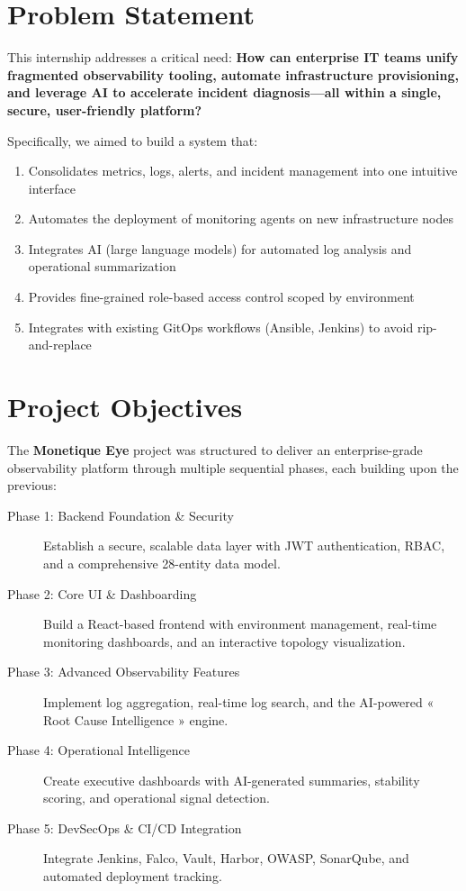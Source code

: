 \documentclass[12pt,a4paper]{report}
\begin{document}
\section*{Problem Statement}

This internship addresses a critical need: \textbf{How can enterprise IT teams unify fragmented observability tooling, automate infrastructure provisioning, and leverage AI to accelerate incident diagnosis—all within a single, secure, user-friendly platform?}

Specifically, we aimed to build a system that:

\begin{enumerate}
  \item Consolidates metrics, logs, alerts, and incident management into one intuitive interface
  \item Automates the deployment of monitoring agents on new infrastructure nodes
  \item Integrates AI (large language models) for automated log analysis and operational summarization
  \item Provides fine-grained role-based access control scoped by environment
  \item Integrates with existing GitOps workflows (Ansible, Jenkins) to avoid rip-and-replace
\end{enumerate}

\section*{Project Objectives}

The \textbf{Monetique Eye} project was structured to deliver an enterprise-grade observability platform through multiple sequential phases, each building upon the previous:

\begin{description}
  \item[Phase 1: Backend Foundation \& Security] Establish a secure, scalable data layer with JWT authentication, RBAC, and a comprehensive 28-entity data model.
  \item[Phase 2: Core UI \& Dashboarding] Build a React-based frontend with environment management, real-time monitoring dashboards, and an interactive topology visualization.
  \item[Phase 3: Advanced Observability Features] Implement log aggregation, real-time log search, and the AI-powered « Root Cause Intelligence » engine.
  \item[Phase 4: Operational Intelligence] Create executive dashboards with AI-generated summaries, stability scoring, and operational signal detection.
  \item[Phase 5: DevSecOps \& CI/CD Integration] Integrate Jenkins, Falco, Vault, Harbor, OWASP, SonarQube, and automated deployment tracking.
\end{description}
\end{document}
